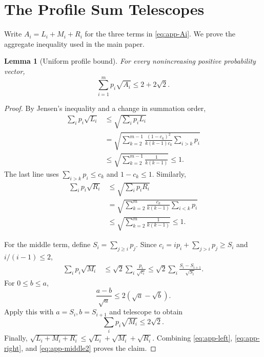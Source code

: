 \documentclass{article}
\newtheorem{lemma}[theorem]{Lemma}
\begin{document}
\section{The Profile Sum Telescopes}
\label{app:telescope}

Write $A_i=L_i+M_i+R_i$ for the three terms in
\eqref{eq:app-Ai}. We prove the aggregate inequality used in the main paper.

\begin{lemma}[Uniform profile bound]
\label{lem:app-profile-sum}
For every nonincreasing positive probability vector,
\begin{equation}
 \sum_{i=1}^mp_i\sqrt{A_i}\le2+2\sqrt2.
 \label{eq:app-profile-sum}
\end{equation}
\end{lemma}

\begin{proof}
By Jensen's inequality and a change in summation order,
\begin{align}
 \sum_i p_i\sqrt{L_i}
 &\le\sqrt{\sum_i p_iL_i}\\
 &=\sqrt{\sum_{k=2}^{m-1}
 \frac{(1-c_k)^2}{k(k-1)c_k}\sum_{i>k}p_i}\\
 &\le\sqrt{\sum_{k=2}^{m-1}\frac1{k(k-1)}}\le1.
 \label{eq:app-left}
\end{align}
The last line uses $\sum_{i>k}p_i\le c_k$ and $1-c_k\le1$. Similarly,
\begin{align}
 \sum_i p_i\sqrt{R_i}
 &\le\sqrt{\sum_i p_iR_i}\\
 &=\sqrt{\sum_{k=2}^{m}\frac{c_k}{k(k-1)}
 \sum_{i<k}p_i}\\
 &\le\sqrt{\sum_{k=2}^{m}\frac1{k(k-1)}}\le1.
 \label{eq:app-right}
\end{align}

For the middle term, define $S_i=\sum_{j\ge i}p_j$. Since
$c_i=ip_i+\sum_{j>i}p_j\ge S_i$ and $i/(i-1)\le2$,
\begin{align}
 \sum_i p_i\sqrt{M_i}
 &\le\sqrt2\sum_i\frac{p_i}{\sqrt{c_i}}
 \le\sqrt2\sum_i\frac{S_i-S_{i+1}}{\sqrt{S_i}}.
 \label{eq:app-middle1}
\end{align}
For $0\le b\le a$,
\begin{equation}
 \frac{a-b}{\sqrt a}\le2(\sqrt a-\sqrt b).
 \label{eq:app-sqrt-telescope}
\end{equation}
Apply this with $a=S_i,b=S_{i+1}$ and telescope to obtain
\begin{equation}
 \sum_i p_i\sqrt{M_i}\le2\sqrt2.
 \label{eq:app-middle2}
\end{equation}
Finally, $\sqrt{L_i+M_i+R_i}\le\sqrt{L_i}+\sqrt{M_i}+\sqrt{R_i}$.
Combining \eqref{eq:app-left}, \eqref{eq:app-right}, and
\eqref{eq:app-middle2} proves the claim.
\end{proof}
\end{document}
